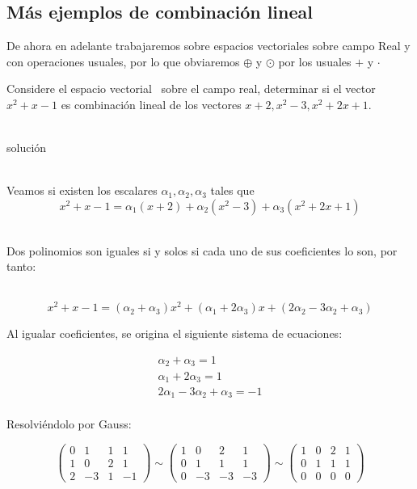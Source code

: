 \subsection{M\'as ejemplos de combinación lineal}

De ahora en adelante trabajaremos sobre espacios vectoriales sobre campo Real y con operaciones usuales, por lo que obviaremos $\oplus$ y $\odot$ por los usuales $+$ y $\cdot$

\begin{ejemplo}
Considere el espacio vectorial \pdos\ sobre el campo real, determinar si el vector $x^2+x-1$ es combinación lineal de los vectores $x+2, x^2-3, x^2+2x+1$.
\end{ejemplo}
~\\
solución

~\\
Veamos si existen los escalares $\alpha_1, \alpha_2, \alpha_3$ tales que
\[x^2+x-1=\alpha_1\left(x+2\right)+
\alpha_2\left(x^2-3\right)+
\alpha_3\left(x^2+2x+1\right)
\]

~\\
Dos polinomios son iguales si y solos si cada uno de sus coeficientes lo son, por tanto:

~\\
\[x^2+x-1=\left(\alpha_2+\alpha_3\right)x^2+
\left(\alpha_1+2\alpha_3\right)x+
\left(2\alpha_2-3\alpha_2+\alpha_3\right)
\]

Al igualar coeficientes, se origina el siguiente sistema de ecuaciones:

\begin{eqnarray*}
\alpha_2+\alpha_3=1\\
\alpha_1+2\alpha_3=1\\
2\alpha_1-3\alpha_2+\alpha_3=-1\\
\end{eqnarray*}

Resolvi\'endolo por Gauss:

\[
\left(
\begin{array}{rrr|r}
0 &1 &1 &1\\
1&0&2&1\\
2 &-3&1&-1
\end{array}
\right)
\sim
\left(
\begin{array}{rrr|r}
1 &0 &2 &1\\
0&1&1&1\\
0 &-3&-3&-3
\end{array}
\right)
\sim
\left(
\begin{array}{rrr|r}
1 &0 &2 &1\\
0&1&1&1\\
0 &0&0&0
\end{array}
\right)\]

